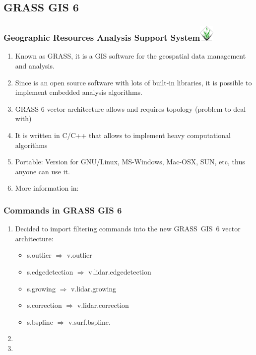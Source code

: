 \subsection{GRASS GIS 6}
\begin{frame}
    \frametitle{Geographic Resources Analysis Support System\hfill \includegraphics[width=0.7cm]{images/grasslogo_transp_big.png}} 
     \begin{enumerate}%
	\item Known as \alert<1>{GRASS}, it is a GIS software for the geospatial data management and analysis.
	\item Since is an open source software with lots of built-in libraries, it is possible to implement embedded analysis algorithms.
	\item GRASS 6 vector architecture allows and requires topology (problem to deal with)
	\item It is written in C/C++ that allows to implement heavy computational algorithms
	\item Portable: Version for GNU/Linux, MS-Windows, Mac-OSX, SUN, etc, thus anyone can use it.
	\item More information in:
    \end{enumerate}
\end{frame}
\begin{frame}
    \frametitle{Commands in GRASS GIS 6}
    \begin{enumerate}
        \item Decided to import filtering commands into the new GRASS~GIS~6 vector architecture:
	\begin{itemize}
	    \item s.outlier $\Rightarrow$ {v.outlier}
	    \item s.edgedetection $\Rightarrow$ {v.lidar.edgedetection}
	    \item s.growing $\Rightarrow$ {v.lidar.growing}
	    \item s.correction $\Rightarrow$ {v.lidar.correction}
	    \item s.bspline $\Rightarrow$ {v.surf.bspline}. 
	\end{itemize}
	\item {}
	\item {}
    \end{enumerate}
\end{frame}
